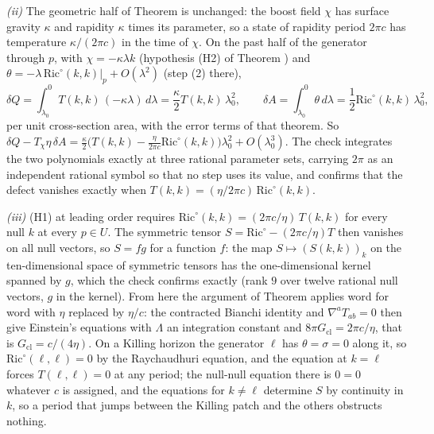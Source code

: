 \emph{(ii)} The geometric half of Theorem  is unchanged: the boost field $\chi$ has surface gravity $\kappa$ and rapidity $\kappa$ times its parameter, so a state of rapidity period $2\pi c$ has temperature $\kappa/(2\pi c)$ in the time of $\chi$. On the past half of the generator through $p$, with $\chi = -\kappa\lambda k$ (hypothesis (H2) of Theorem ) and $\theta = -\lambda\,\mathrm{Ric}^{\circ}(k,k)|_{p} + O(\lambda^{2})$ (step (2) there),
\[
\delta Q = \int_{\lambda_{0}}^{0}T(k,k)\,(-\kappa\lambda)\,d\lambda = \frac{\kappa}{2}T(k,k)\,\lambda_{0}^{2}, \qquad
\delta A = \int_{\lambda_{0}}^{0}\theta\,d\lambda = \frac12\mathrm{Ric}^{\circ}(k,k)\,\lambda_{0}^{2},
\]
per unit cross-section area, with the error terms of that theorem. So $\delta Q - T_{\chi}\eta\,\delta A = \tfrac{\kappa}{2}\bigl(T(k,k) - \tfrac{\eta}{2\pi c}\mathrm{Ric}^{\circ}(k,k)\bigr)\lambda_{0}^{2} + O(\lambda_{0}^{3})$. The check integrates the two polynomials exactly at three rational parameter sets, carrying $2\pi$ as an independent rational symbol so that no step uses its value, and confirms that the defect vanishes exactly when $T(k,k) = (\eta/2\pi c)\,\mathrm{Ric}^{\circ}(k,k)$.

\emph{(iii)} (H1) at leading order requires $\mathrm{Ric}^{\circ}(k,k) = (2\pi c/\eta)\,T(k,k)$ for every null $k$ at every $p \in U$. The symmetric tensor $S = \mathrm{Ric}^{\circ} - (2\pi c/\eta)T$ then vanishes on all null vectors, so $S = f g$ for a function $f$: the map $S \mapsto (S(k,k))_{k}$ on the ten-dimensional space of symmetric tensors has the one-dimensional kernel spanned by $g$, which the check confirms exactly (rank $9$ over twelve rational null vectors, $g$ in the kernel). From here the argument of Theorem  applies word for word with $\eta$ replaced by $\eta/c$: the contracted Bianchi identity and $\nabla^{a}T_{ab} = 0$ then give Einstein's equations with $\Lambda$ an integration constant and $8\pi G_{\mathrm{cl}} = 2\pi c/\eta$, that is $G_{\mathrm{cl}} = c/(4\eta)$. On a Killing horizon the generator $\ell$ has $\theta = \sigma = 0$ along it, so $\mathrm{Ric}^{\circ}(\ell,\ell) = 0$ by the Raychaudhuri equation, and the equation at $k = \ell$ forces $T(\ell,\ell) = 0$ at any period; the null-null equation there is $0 = 0$ whatever $c$ is assigned, and the equations for $k \neq \ell$ determine $S$ by continuity in $k$, so a period that jumps between the Killing patch and the others obstructs nothing.

